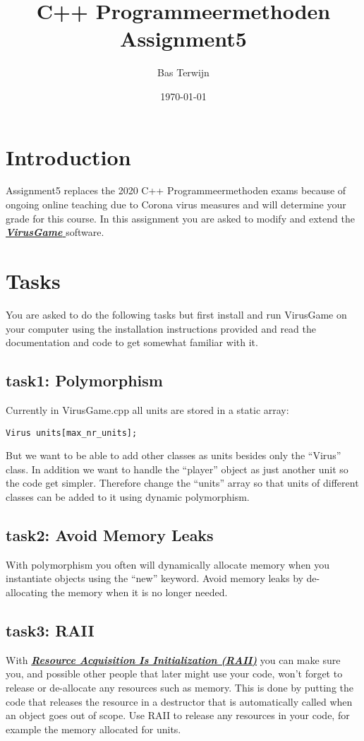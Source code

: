 \documentclass[12pt]{article}
\title{C++ Programmeermethoden Assignment5}
\author{Bas Terwijn}
\date{\today}
\newcommand*{\link}[2]{\href{#1}{\color{blue}\textbf{\textit{#2}}}}
\begin{document}
\maketitle

\section{Introduction}
Assignment5 replaces the 2020 C++ Programmeermethoden exams because of
ongoing online teaching due to Corona virus measures and will
determine your grade for this course. In this assignment you are asked
to modify and extend the
\link{https://bitbucket.org/bterwijn/virusgame} { VirusGame }
software.
     
\section{Tasks}
You are asked to do the following tasks but first install and run
VirusGame on your computer using the installation instructions
provided and read the documentation and code to get somewhat
familiar with it.

\subsection{task1: Polymorphism}
Currently in VirusGame.cpp all units are stored in a static array:

\begin{tcolorbox}
\begin{verbatim}
Virus units[max_nr_units];
\end{verbatim}
\end{tcolorbox}

But we want to be able to add other classes as units besides only the
``Virus'' class. In addition we want to handle the ``player'' object as
just another unit so the code get simpler. Therefore change the
``units'' array so that units of different classes can be added to it
using dynamic polymorphism.

\subsection{task2: Avoid Memory Leaks}
With polymorphism you often will dynamically allocate memory when you
instantiate objects using the ``new'' keyword. Avoid memory leaks by
de-allocating the memory when it is no longer needed.

\subsection{task3: RAII}
With \link{https://en.cppreference.com/w/cpp/language/raii}{Resource
  Acquisition Is Initialization (RAII)} you can make sure you, and
possible other people that later might use your code, won't forget to
release or de-allocate any resources such as memory. This is done by
putting the code that releases the resource in a destructor that is
automatically called when an object goes out of scope. Use RAII to
release any resources in your code, for example the memory allocated
for units.
\end{document}
